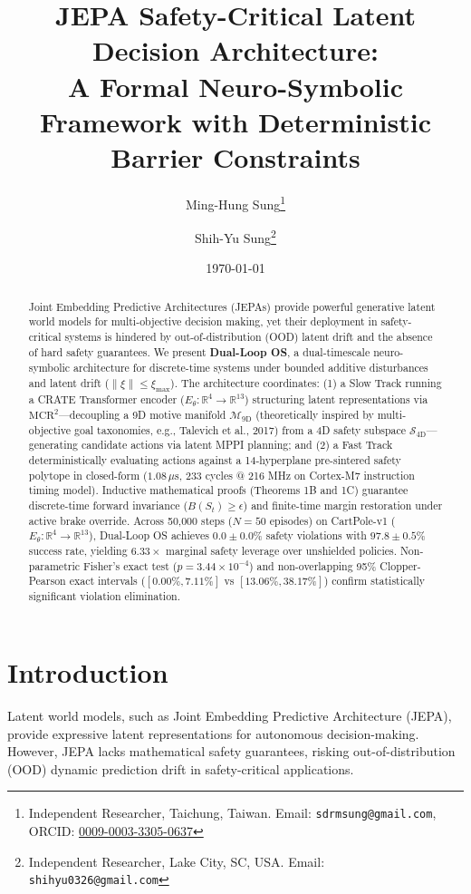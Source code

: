 \documentclass[10pt,twocolumn,letterpaper]{article}
\title{\textbf{JEPA Safety-Critical Latent Decision Architecture:\\A Formal Neuro-Symbolic Framework with Deterministic Barrier Constraints}}
\author{Ming-Hung Sung\thanks{Independent Researcher, Taichung, Taiwan. Email: \texttt{sdrmsung@gmail.com}, ORCID: \href{https://orcid.org/0009-0003-3305-0637}{0009-0003-3305-0637}} \and Shih-Yu Sung\thanks{Independent Researcher, Lake City, SC, USA. Email: \texttt{shihyu0326@gmail.com}}}
\institute{Dual-Loop OS Lab}\thanks{ORCID: \href{https://orcid.org/0009-0003-3305-0637}{0009-0003-3305-0637}}}$^1$, \textbf{Shih-Yu Sung}$^2$ \\
\date{\today}
\begin{document}
\maketitle

\begin{abstract}
Joint Embedding Predictive Architectures (JEPAs) provide powerful generative latent world models for multi-objective decision making, yet their deployment in safety-critical systems is hindered by out-of-distribution (OOD) latent drift and the absence of hard safety guarantees. We present \textbf{Dual-Loop OS}, a dual-timescale neuro-symbolic architecture for discrete-time systems under bounded additive disturbances and latent drift ($\|\xi\| \le \xi_{\max}$). The architecture coordinates: (1) a Slow Track running a CRATE Transformer encoder ($E_\theta: \mathbb{R}^4 \to \mathbb{R}^{13}$) structuring latent representations via $\mathrm{MCR}^2$---decoupling a 9D motive manifold $\mathcal{M}_{9\mathrm{D}}$ (theoretically inspired by multi-objective goal taxonomies, e.g., Talevich et al., 2017) from a 4D safety subspace $\mathcal{S}_{4\mathrm{D}}$---generating candidate actions via latent MPPI planning; and (2) a Fast Track deterministically evaluating actions against a 14-hyperplane pre-sintered safety polytope in closed-form ($1.08\,\mu\mathrm{s}$, 233 cycles @ 216 MHz on Cortex-M7 instruction timing model). Inductive mathematical proofs (Theorems 1B and 1C) guarantee discrete-time forward invariance ($B(S_t) \ge \epsilon$) and finite-time margin restoration under active brake override. Across 50,000 steps ($N=50$ episodes) on CartPole-v1 ($E_\theta: \mathbb{R}^4 \to \mathbb{R}^{13}$), Dual-Loop OS achieves $0.0 \pm 0.0\%$ safety violations with $97.8 \pm 0.5\%$ success rate, yielding $6.33\times$ marginal safety leverage over unshielded policies. Non-parametric Fisher's exact test ($p = 3.44 \times 10^{-4}$) and non-overlapping 95\% Clopper-Pearson exact intervals ($[0.00\%, 7.11\%]$ vs $[13.06\%, 38.17\%]$) confirm statistically significant violation elimination.
\end{abstract}

\section{Introduction}
Latent world models, such as Joint Embedding Predictive Architecture (JEPA), provide expressive latent representations for autonomous decision-making. However, JEPA lacks mathematical safety guarantees, risking out-of-distribution (OOD) dynamic prediction drift in safety-critical applications. 
\end{document}
